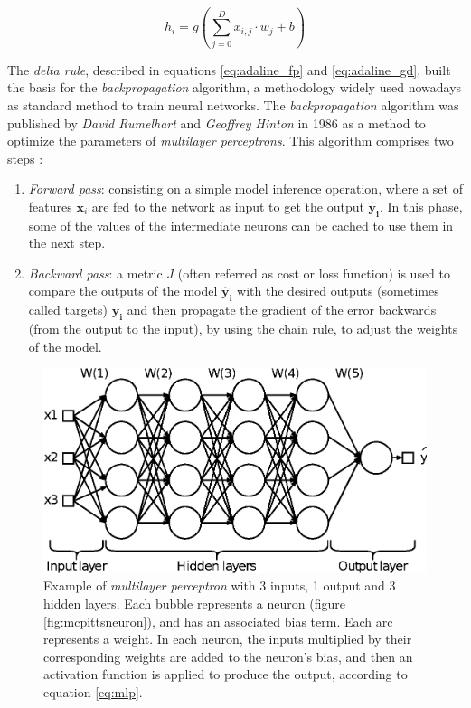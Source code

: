  \begin{equation}
 \label{eq:mlp}
 h_i = g\left(\sum_{j=0}^{D} x_{i,j} \cdot w_{j} + b\right)
 \end{equation}

 The \textit{delta rule}, described in equations \ref{eq:adaline_fp} and \ref{eq:adaline_gd}, built the basis for the \textit{backpropagation} algorithm, a methodology widely used nowadays as standard method to train neural networks. The \textit{backpropagation} algorithm \autocite{hinton1986} was published by \textit{David Rumelhart} and \textit{Geoffrey Hinton} in 1986 as a method to optimize the parameters of \textit{multilayer perceptrons}. This algorithm comprises two steps \autocite{haykin1998}:

\begin{enumerate}
\item \textit{Forward pass}: consisting on a simple model inference operation, where a set of features $\mathbf{x}_i$ are fed to the network as input to get the output $\mathbf{\hat{y}_i}$. In this phase, some of the values of the intermediate neurons can be cached to use them in the next step.

\item \textit{Backward pass}: a metric $J$ (often referred as cost or loss function) is used to compare the outputs of the model $\mathbf{\hat{y}_i}$ with the desired outputs (sometimes called targets) $\mathbf{y_i}$ and then propagate the gradient of the error backwards (from the output to the input), by using the chain rule, to adjust the weights of the model.
\end{enumerate}


\begin{figure}
	\centering
	\includegraphics[width=0.8\linewidth]{background/images/mlp}
	\caption[Multilayer perceptron]{Example of \textit{multilayer perceptron} with 3 inputs, 1 output and 3 hidden layers. Each bubble represents a neuron (figure \ref{fig:mcpittsneuron}), and has an associated bias term. Each arc represents a weight. In each neuron, the inputs multiplied by their corresponding weights are added to the neuron's bias, and then an activation function is applied to produce the output, according to equation \ref{eq:mlp}.}
	\label{fig:mlp}
\end{figure}


